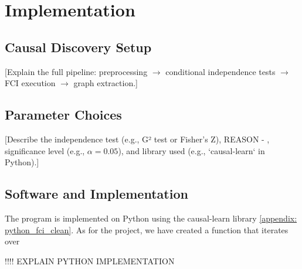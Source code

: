 \documentclass[main.tex]{subfiles}
\begin{document}
\section{Implementation}

\subsection{Causal Discovery Setup}
[Explain the full pipeline: preprocessing $\rightarrow$ conditional independence tests $\rightarrow$ FCI execution $\rightarrow$ graph extraction.]

\subsection{Parameter Choices}
[Describe the independence test (e.g., G² test or Fisher's Z), REASON - , significance level (e.g., $\alpha = 0.05$), and library used (e.g., `causal-learn` in Python).]

\subsection{Software and Implementation}
The program is implemented on Python using the causal-learn library \ref{appendix: python_fci_clean}. As for the project, we have created a function that iterates over 

!!!! EXPLAIN PYTHON IMPLEMENTATION
\end{document}
